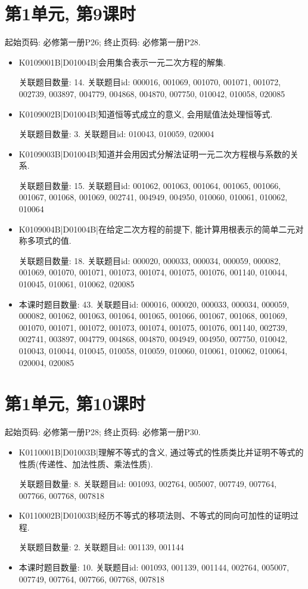 \section*{第1单元, 第9课时}
起始页码: 必修第一册P26; 终止页码: 必修第一册P28.
\begin{itemize}
\item K0109001B|D01004B|会用集合表示一元二次方程的解集.

关联题目数量: 14. 关联题目id: 000016, 001069, 001070, 001071, 001072, 002739, 003897, 004779, 004868, 004870, 007750, 010042, 010058, 020085

\item K0109002B|D01004B|知道恒等式成立的意义, 会用赋值法处理恒等式.

关联题目数量: 3. 关联题目id: 010043, 010059, 020004

\item K0109003B|D01004B|知道并会用因式分解法证明一元二次方程根与系数的关系.

关联题目数量: 15. 关联题目id: 001062, 001063, 001064, 001065, 001066, 001067, 001068, 001069, 002741, 004949, 004950, 010060, 010061, 010062, 010064

\item K0109004B|D01004B|在给定二次方程的前提下, 能计算用根表示的简单二元对称多项式的值.

关联题目数量: 18. 关联题目id: 000020, 000033, 000034, 000059, 000082, 001069, 001070, 001071, 001073, 001074, 001075, 001076, 001140, 010044, 010045, 010061, 010062, 020085

\item 本课时题目数量: 43. 关联题目id: 000016, 000020, 000033, 000034, 000059, 000082, 001062, 001063, 001064, 001065, 001066, 001067, 001068, 001069, 001070, 001071, 001072, 001073, 001074, 001075, 001076, 001140, 002739, 002741, 003897, 004779, 004868, 004870, 004949, 004950, 007750, 010042, 010043, 010044, 010045, 010058, 010059, 010060, 010061, 010062, 010064, 020004, 020085

\end{itemize}

\section*{第1单元, 第10课时}
起始页码: 必修第一册P28; 终止页码: 必修第一册P30.
\begin{itemize}
\item K0110001B|D01003B|理解不等式的含义, 通过等式的性质类比并证明不等式的性质(传递性、加法性质、乘法性质).

关联题目数量: 8. 关联题目id: 001093, 002764, 005007, 007749, 007764, 007766, 007768, 007818

\item K0110002B|D01003B|经历不等式的移项法则、不等式的同向可加性的证明过程.

关联题目数量: 2. 关联题目id: 001139, 001144

\item 本课时题目数量: 10. 关联题目id: 001093, 001139, 001144, 002764, 005007, 007749, 007764, 007766, 007768, 007818

\end{itemize}

